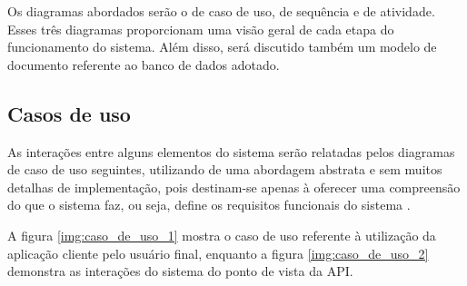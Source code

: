 Os diagramas abordados serão o de caso de uso, de sequência e de atividade. Esses três diagramas proporcionam uma visão geral de cada etapa do funcionamento do sistema. Além disso, será discutido também um modelo de documento referente ao banco de dados adotado.

\subsection{Casos de uso} \label{subsec:casosDeUso}

As interações entre alguns elementos do sistema serão relatadas pelos diagramas de caso de uso seguintes, utilizando de uma abordagem abstrata e sem muitos detalhas de implementação, pois destinam-se apenas à oferecer uma compreensão do que o sistema faz, ou seja, define os requisitos funcionais do sistema \cite{sommerville2011engenharia}.

A figura \ref{img:caso_de_uso_1} mostra o caso de uso referente à utilização da aplicação cliente pelo usuário final, enquanto a figura \ref{img:caso_de_uso_2} demonstra as interações do sistema do ponto de vista da API.


